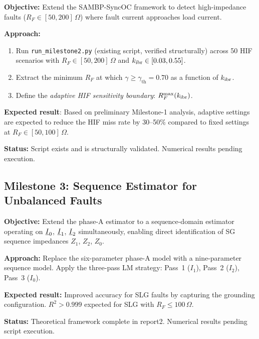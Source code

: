 \begin{tcolorbox}[colback=orange!5,colframe=orange!60!black,
  fonttitle=\bfseries\small,
  title={C9a --- HIF Extension (Pending)},
  breakable]
\small
\textbf{Objective:} Extend the SAMBP-SyncOC framework to detect
high-impedance faults ($R_F \in [50, 200]\,\Omega$) where fault current
approaches load current.

\textbf{Approach:}
\begin{enumerate}
\item Run \texttt{run\_milestone2.py} (existing script, verified structurally)
      across 50 HIF scenarios with $R_F \in [50, 200]\,\Omega$ and
      $k_\mathrm{ibr} \in [0.03, 0.55]$.
\item Extract the minimum $R_F$ at which $\gamma \geq \gamma_\mathrm{th} = 0.70$
      as a function of $k_\mathrm{ibr}$.
\item Define the \emph{adaptive HIF sensitivity boundary}:
      $R_F^\mathrm{max}(k_\mathrm{ibr})$.
\end{enumerate}

\textbf{Expected result}: Based on preliminary Milestone-1 analysis,
adaptive settings are expected to reduce the HIF miss rate by 30--50\%
compared to fixed settings at $R_F \in [50, 100]\,\Omega$.

\textbf{Status:} Script exists and is structurally validated.
Numerical results pending execution.
\end{tcolorbox}

\subsection{Milestone 3: Sequence Estimator for Unbalanced Faults}
\label{sec:ch5_seq}

\begin{tcolorbox}[colback=orange!5,colframe=orange!60!black,
  fonttitle=\bfseries\small,
  title={C9b --- Sequence Estimator (Pending)},
  breakable]
\small
\textbf{Objective:} Extend the phase-A estimator to a sequence-domain
estimator operating on $\underline{I}_0$, $\underline{I}_1$, $\underline{I}_2$
simultaneously, enabling direct identification of SG sequence impedances
$Z_1$, $Z_2$, $Z_0$.

\textbf{Approach:} Replace the six-parameter phase-A model with a
nine-parameter sequence model. Apply the three-pass LM strategy:
Pass~1 ($I_1$), Pass~2 ($I_2$), Pass~3 ($I_0$).

\textbf{Expected result:} Improved accuracy for SLG faults by capturing
the grounding configuration. $R^2 > 0.999$ expected for SLG with
$R_F \leq 100\,\Omega$.

\textbf{Status:} Theoretical framework complete in report2.
Numerical results pending script execution.
\end{tcolorbox}

